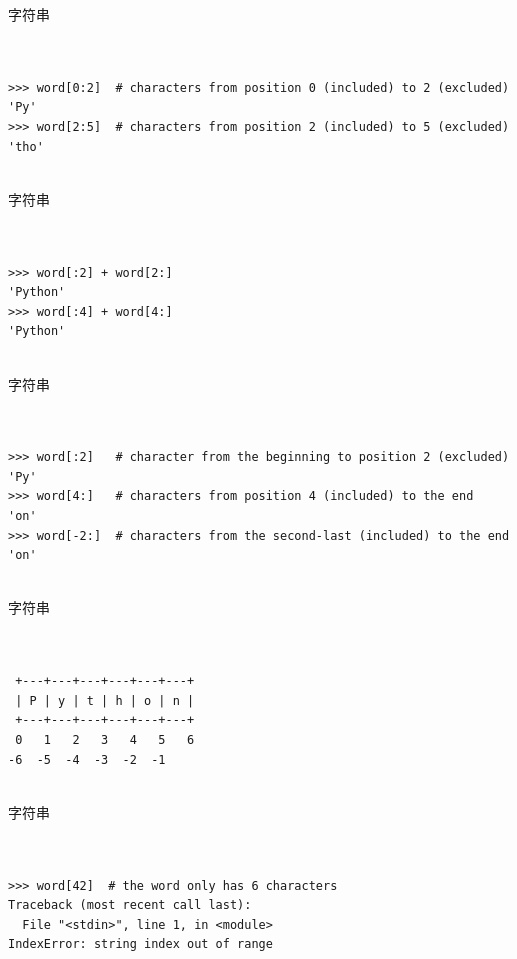 \documentclass{beamer}
\begin{document}
\begin{frame}[t,fragile]{字符串}


\begin{verbatim}


>>> word[0:2]  # characters from position 0 (included) to 2 (excluded)
'Py'
>>> word[2:5]  # characters from position 2 (included) to 5 (excluded)
'tho'


\end{verbatim}


\end{frame}




\begin{frame}[t,fragile]{字符串}


\begin{verbatim}


>>> word[:2] + word[2:]
'Python'
>>> word[:4] + word[4:]
'Python'


\end{verbatim}


\end{frame}




\begin{frame}[t,fragile]{字符串}


\begin{verbatim}


>>> word[:2]   # character from the beginning to position 2 (excluded)
'Py'
>>> word[4:]   # characters from position 4 (included) to the end
'on'
>>> word[-2:]  # characters from the second-last (included) to the end
'on'


\end{verbatim}


\end{frame}



\begin{frame}[t,fragile]{字符串}


\begin{verbatim}


 +---+---+---+---+---+---+
 | P | y | t | h | o | n |
 +---+---+---+---+---+---+
 0   1   2   3   4   5   6
-6  -5  -4  -3  -2  -1


\end{verbatim}


\end{frame}





\begin{frame}[t,fragile]{字符串}


\begin{verbatim}


>>> word[42]  # the word only has 6 characters
Traceback (most recent call last):
  File "<stdin>", line 1, in <module>
IndexError: string index out of range


\end{verbatim}


\end{frame}
\end{document}
